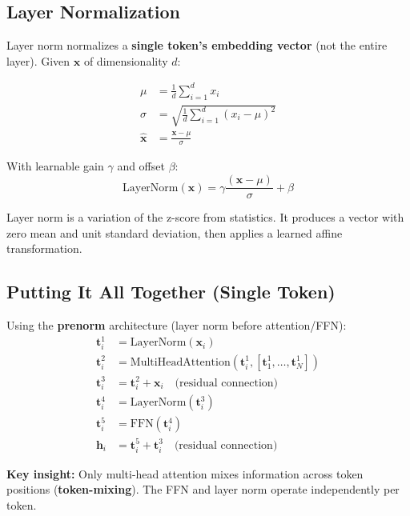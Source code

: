 \documentclass[main.tex]{subfiles}
\begin{document}
\subsection{Layer Normalization}

Layer norm normalizes a \textbf{single token's embedding vector} (not the entire layer). Given $\mathbf{x}$ of dimensionality $d$:

\begin{align}
\mu &= \frac{1}{d} \sum_{i=1}^{d} x_i \tag{8.22} \\[6pt]
\sigma &= \sqrt{\frac{1}{d} \sum_{i=1}^{d} (x_i - \mu)^2} \tag{8.23} \\[6pt]
\hat{\mathbf{x}} &= \frac{\mathbf{x} - \mu}{\sigma} \tag{8.24}
\end{align}

With learnable gain $\gamma$ and offset $\beta$:
$$\boxed{\text{LayerNorm}(\mathbf{x}) = \gamma \frac{(\mathbf{x} - \mu)}{\sigma} + \beta} \tag{8.25}$$

\begin{remark}
Layer norm is a variation of the z-score from statistics. It produces a vector with zero mean and unit standard deviation, then applies a learned affine transformation.
\end{remark}

\subsection{Putting It All Together (Single Token)}

Using the \textbf{prenorm} architecture (layer norm before attention/FFN):
\begin{align}
\mathbf{t}_i^1 &= \text{LayerNorm}(\mathbf{x}_i) \tag{8.26} \\
\mathbf{t}_i^2 &= \text{MultiHeadAttention}(\mathbf{t}_i^1, [\mathbf{t}_1^1, \ldots, \mathbf{t}_N^1]) \tag{8.27} \\
\mathbf{t}_i^3 &= \mathbf{t}_i^2 + \mathbf{x}_i \quad \text{(residual connection)} \tag{8.28} \\
\mathbf{t}_i^4 &= \text{LayerNorm}(\mathbf{t}_i^3) \tag{8.29} \\
\mathbf{t}_i^5 &= \text{FFN}(\mathbf{t}_i^4) \tag{8.30} \\
\mathbf{h}_i &= \mathbf{t}_i^5 + \mathbf{t}_i^3 \quad \text{(residual connection)} \tag{8.31}
\end{align}

\textbf{Key insight:} Only multi-head attention mixes information across token positions (\textbf{token-mixing}). The FFN and layer norm operate independently per token.
\end{document}

